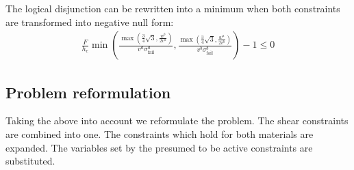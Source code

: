The logical disjunction can be rewritten into a minimum when both constraints are transformed into negative null form:
\begin{align*}
	\frac{F}{h_\text{c}}  \min{\left( \frac{ \max{\left( \frac34 \sqrt{3}, \frac{w^b}{2v^a} \right)} }{ v^a \sigma^a_\text{fail} }  
		, \frac{ \max{\left( \frac34 \sqrt{3}, \frac{w^a}{2v^b} \right)} }{ v^b \sigma^b_\text{fail} }   \right)} - 1 \le 0  
\end{align*}



\subsection{Problem reformulation}
Taking the above into account we reformulate the problem.
The shear constraints are combined into one.
The constraints which hold for both materials are expanded.
The variables set by the presumed to be active constraints are substituted.

